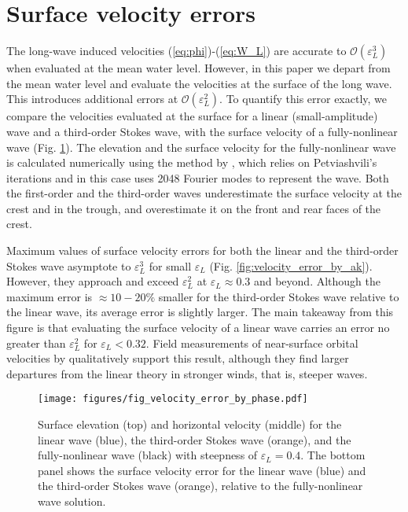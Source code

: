 \documentclass[lineno]{jfm}
\begin{document}


\appendix

\section{Surface velocity errors}
\label{appendix:surface_velocity_errors}

The long-wave induced velocities (\ref{eq:phi})-(\ref{eq:W_L}) are accurate to
$\mathcal{O}(\varepsilon_L^3)$ when evaluated at the mean water level.
However, in this paper we depart from the mean water level and evaluate the
velocities at the surface of the long wave.
This introduces additional errors at $\mathcal{O}(\varepsilon_L^2)$.
To quantify this error exactly, we compare the velocities evaluated at the
surface for a linear (small-amplitude) wave and a third-order Stokes wave,
with the surface velocity of a fully-nonlinear wave
(Fig. \ref{fig:velocity_error_by_phase}).
The elevation and the surface velocity for the fully-nonlinear wave is
calculated numerically using the method by \citet{clamond2018accurate},
which relies on Petviashvili's iterations and in this case uses 2048 Fourier
modes to represent the wave.
Both the first-order and the third-order waves underestimate the surface velocity
at the crest and in the trough, and overestimate it on the front and rear faces
of the crest.

Maximum values of surface velocity errors for both the linear and the
third-order Stokes wave asymptote to $\varepsilon_L^3$ for small
$\varepsilon_L$ (Fig. \ref{fig:velocity_error_by_ak}).
However, they approach and exceed $\varepsilon_L^2$ at $\varepsilon_L \approx 0.3$
and beyond.
Although the maximum error is $\approx 10-20\%$ smaller for the third-order
Stokes wave relative to the linear wave, its average error is slightly larger.
The main takeaway from this figure is that evaluating the surface velocity
of a linear wave carries an error no greater than $\varepsilon_L^2$ for
$\varepsilon_L < 0.32$.
Field measurements of near-surface orbital velocities by
\citet{laxague2020observations} qualitatively support this result, although
they find larger departures from the linear theory in stronger winds, that is,
steeper waves.

\begin{figure}
\centering
\texttt{[image: figures/fig\_velocity\_error\_by\_phase.pdf]}
\caption{
  Surface elevation (top) and horizontal velocity (middle) for the linear wave
  (blue), the third-order Stokes wave (orange), and the fully-nonlinear wave
  (black) with steepness of $\varepsilon_L = 0.4$.
  The bottom panel shows the surface velocity error for the linear wave (blue)
  and the third-order Stokes wave (orange), relative to the fully-nonlinear
  wave solution.
}
\label{fig:velocity_error_by_phase}
\end{figure}
\end{document}
